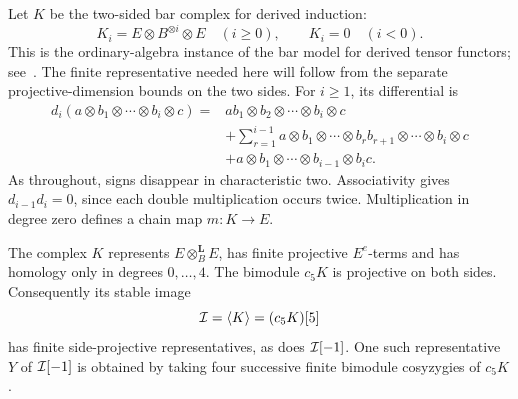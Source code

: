 Let \(K\) be the two-sided bar complex for derived induction:
\[
 K_i=E\otimes B^{\otimes i}\otimes E\quad(i\geq0),\qquad K_i=0\quad(i<0).
\]
This is the ordinary-algebra instance of the bar model for derived
tensor functors; see~\cite[Sections~6.1 and~6.6]{Keller1994}.
The finite representative needed here will follow from the separate
projective-dimension bounds on the two sides.
For \(i\geq1\), its differential is
\begin{align*}
 d_i(a\otimes b_1\otimes\cdots\otimes b_i\otimes c)
 ={}&
 ab_1\otimes b_2\otimes\cdots\otimes b_i\otimes c\\
 &+\sum_{r=1}^{i-1}
 a\otimes b_1\otimes\cdots\otimes b_rb_{r+1}
       \otimes\cdots\otimes b_i\otimes c\\
 &+a\otimes b_1\otimes\cdots\otimes b_{i-1}\otimes b_ic .
\end{align*}
As throughout, signs disappear in characteristic two.  Associativity
gives \(d_{i-1}d_i=0\), since each double multiplication occurs twice.
Multiplication in degree zero defines a chain map \(m:K\to E\).

\begin{lemma}\label{b:bar-model}
The complex \(K\) represents \(E\otimes_B^{\mathbf L}E\), has finite
projective \(E^e\)-terms and has homology only in degrees \(0,\ldots,4\).
The bimodule \(c_5K\) is projective on both sides.  Consequently its
stable image
\[
 \mathcal I=\langle K\rangle=(c_5K)[5]
\]
has finite side-projective representatives, as does \(\mathcal I[-1]\).
One such representative \(Y\) of \(\mathcal I[-1]\) is obtained by taking four
successive finite bimodule cosyzygies of \(c_5K\).
\end{lemma}

